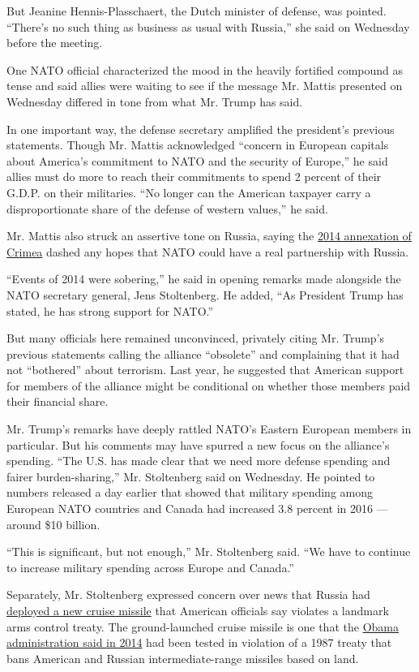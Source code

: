 But Jeanine Hennis-Plasschaert, the Dutch minister of defense, was
pointed. ``There's no such thing as business as usual with Russia,'' she
said on Wednesday before the meeting.

One NATO official characterized the mood in the heavily fortified
compound as tense and said allies were waiting to see if the message Mr.
Mattis presented on Wednesday differed in tone from what Mr. Trump has
said.

In one important way, the defense secretary amplified the president's
previous statements. Though Mr. Mattis acknowledged ``concern in
European capitals about America's commitment to NATO and the security of
Europe,'' he said allies must do more to reach their commitments to
spend 2 percent of their G.D.P. on their militaries. ``No longer can the
American taxpayer carry a disproportionate share of the defense of
western values,'' he said.

Mr. Mattis also struck an assertive tone on Russia, saying the
\href{https://www.nytimes.com/2014/03/19/world/europe/ukraine.html}{2014
annexation of Crimea} dashed any hopes that NATO could have a real
partnership with Russia.

``Events of 2014 were sobering,'' he said in opening remarks made
alongside the NATO secretary general, Jens Stoltenberg. He added, ``As
President Trump has stated, he has strong support for NATO.''

But many officials here remained unconvinced, privately citing Mr.
Trump's previous statements calling the alliance ``obsolete'' and
complaining that it had not ``bothered'' about terrorism. Last year, he
suggested that American support for members of the alliance might be
conditional on whether those members paid their financial share.

Mr. Trump's remarks have deeply rattled NATO's Eastern European members
in particular. But his comments may have spurred a new focus on the
alliance's spending. ``The U.S. has made clear that we need more defense
spending and fairer burden-sharing,'' Mr. Stoltenberg said on Wednesday.
He pointed to numbers released a day earlier that showed that military
spending among European NATO countries and Canada had increased 3.8
percent in 2016 --- around \$10 billion.

``This is significant, but not enough,'' Mr. Stoltenberg said. ``We have
to continue to increase military spending across Europe and Canada.''

Separately, Mr. Stoltenberg expressed concern over news that Russia had
\href{https://www.nytimes.com/2017/02/14/world/europe/russia-cruise-missile-arms-control-treaty.html}{deployed
a new cruise missile} that American officials say violates a landmark
arms control treaty. The ground-launched cruise missile is one that the
\href{https://www.nytimes.com/2014/07/29/world/europe/us-says-russia-tested-cruise-missile-in-violation-of-treaty.html}{Obama
administration said in 2014} had been tested in violation of a 1987
treaty that bans American and Russian intermediate-range missiles based
on land.

